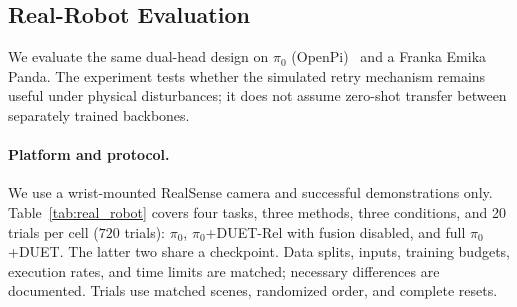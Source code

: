 \documentclass[letterpaper, 10 pt, conference]{ieeeconf}
\begin{document}

\subsection{Real-Robot Evaluation}
\label{sec:real_robot}
We evaluate the same dual-head design on $\pi_0$ (OpenPi)~\cite{pi0} and a Franka Emika Panda. The experiment tests whether the simulated retry mechanism remains useful under physical disturbances; it does not assume zero-shot transfer between separately trained backbones.

\paragraph{Platform and protocol.}
We use a wrist-mounted RealSense camera and successful demonstrations only. Table~\ref{tab:real_robot} covers four tasks, three methods, three conditions, and 20 trials per cell ($720$ trials): $\pi_0$, $\pi_0$+DUET-Rel with fusion disabled, and full $\pi_0$+DUET. The latter two share a checkpoint. Data splits, inputs, training budgets, execution rates, and time limits are matched; necessary differences are documented. Trials use matched scenes, randomized order, and complete resets.
\end{document}
